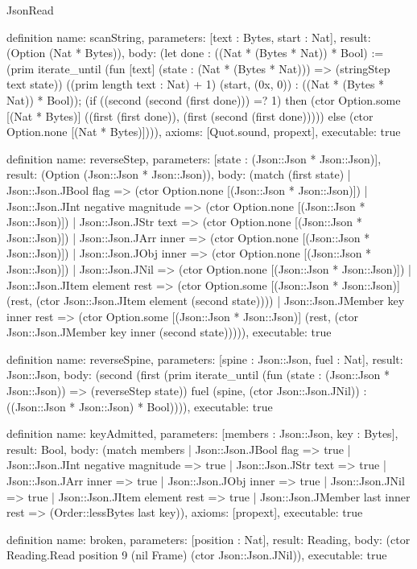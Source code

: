 \begin{lexlean}{JsonRead}
\begin{semanticmodule}
definition{
  name: scanString,
  parameters: [text : Bytes, start : Nat],
  result: (Option (Nat * Bytes)),
  body: (let done : ((Nat * (Bytes * Nat)) * Bool) := (prim iterate_until (fun [text] (state : (Nat * (Bytes * Nat))) => (stringStep text state)) ((prim length text : Nat) + 1) (start, (0x, 0)) : ((Nat * (Bytes * Nat)) * Bool)); (if ((second (second (first done))) =? 1) then (ctor Option.some [(Nat * Bytes)] ((first (first done)), (first (second (first done))))) else (ctor Option.none [(Nat * Bytes)]))),
  axioms: [Quot.sound, propext],
  executable: true
}

definition{
  name: reverseStep,
  parameters: [state : (Json::Json * Json::Json)],
  result: (Option (Json::Json * Json::Json)),
  body: (match (first state)
    | Json::Json.JBool flag => (ctor Option.none [(Json::Json * Json::Json)])
    | Json::Json.JInt negative magnitude => (ctor Option.none [(Json::Json * Json::Json)])
    | Json::Json.JStr text => (ctor Option.none [(Json::Json * Json::Json)])
    | Json::Json.JArr inner => (ctor Option.none [(Json::Json * Json::Json)])
    | Json::Json.JObj inner => (ctor Option.none [(Json::Json * Json::Json)])
    | Json::Json.JNil => (ctor Option.none [(Json::Json * Json::Json)])
    | Json::Json.JItem element rest => (ctor Option.some [(Json::Json * Json::Json)] (rest, (ctor Json::Json.JItem element (second state))))
    | Json::Json.JMember key inner rest => (ctor Option.some [(Json::Json * Json::Json)] (rest, (ctor Json::Json.JMember key inner (second state))))),
  executable: true
}

definition{
  name: reverseSpine,
  parameters: [spine : Json::Json, fuel : Nat],
  result: Json::Json,
  body: (second (first (prim iterate_until (fun (state : (Json::Json * Json::Json)) => (reverseStep state)) fuel (spine, (ctor Json::Json.JNil)) : ((Json::Json * Json::Json) * Bool)))),
  executable: true
}

definition{
  name: keyAdmitted,
  parameters: [members : Json::Json, key : Bytes],
  result: Bool,
  body: (match members
    | Json::Json.JBool flag => true
    | Json::Json.JInt negative magnitude => true
    | Json::Json.JStr text => true
    | Json::Json.JArr inner => true
    | Json::Json.JObj inner => true
    | Json::Json.JNil => true
    | Json::Json.JItem element rest => true
    | Json::Json.JMember last inner rest => (Order::lessBytes last key)),
  axioms: [propext],
  executable: true
}

definition{
  name: broken,
  parameters: [position : Nat],
  result: Reading,
  body: (ctor Reading.Read position 9 (nil Frame) (ctor Json::Json.JNil)),
  executable: true
}


\end{semanticmodule}
\end{lexlean}
